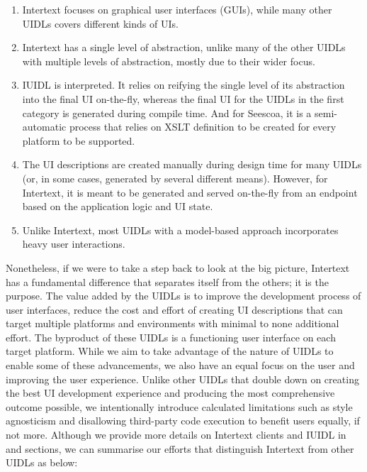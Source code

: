 \begin{enumerate}
  \item Intertext focuses on graphical user interfaces (GUIs), while many other UIDLs covers different kinds of UIs.
  
  \item Intertext has a single level of abstraction, unlike many of the other UIDLs with multiple levels of abstraction, mostly due to their wider focus.
  
  \item IUIDL is interpreted. It relies on reifying the single level of its abstraction into the final UI on-the-fly, whereas the final UI for the UIDLs in the first category is generated during compile time. And for Seescoa, it is a semi-automatic process that relies on XSLT definition to be created for every platform to be supported.
  
  \item The UI descriptions are created manually during design time for many UIDLs (or, in some cases, generated by several different means). However, for Intertext, it is meant to be generated and served on-the-fly from an endpoint based on the application logic and UI state.
  
  \item Unlike Intertext, most UIDLs with a model-based approach incorporates heavy user interactions.
\end{enumerate}

Nonetheless, if we were to take a step back to look at the big picture, Intertext has a fundamental difference that separates itself from the others; it is the purpose. The value added by the UIDLs is to improve the development process of user interfaces, reduce the cost and effort of creating UI descriptions that can target multiple platforms and environments with minimal to none additional effort. The byproduct of these UIDLs is a functioning user interface on each target platform. While we aim to take advantage of the nature of UIDLs to enable some of these advancements, we also have an equal focus on the user and improving the user experience. Unlike other UIDLs that double down on creating the best UI development experience and producing the most comprehensive outcome possible, we intentionally introduce calculated limitations such as style agnosticism and disallowing third-party code execution to benefit users equally, if not more. Although we provide more details on Intertext clients and IUIDL in  and  sections, we can summarise our efforts that distinguish Intertext from other UIDLs as below:

